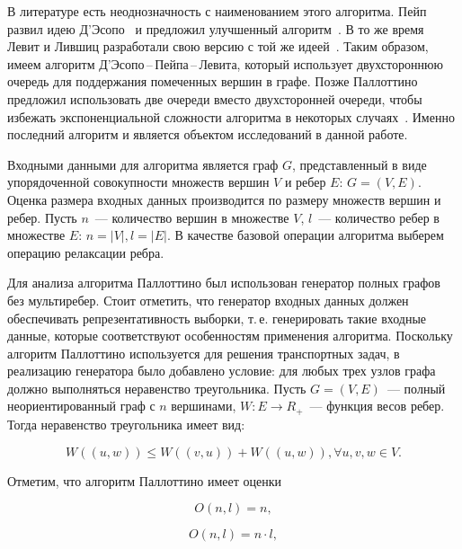 \documentclass[a4paper, article, 14pt]{extarticle}
\begin{document}
В литературе есть неоднозначность с наименованием этого алгоритма. Пейп развил идею Д'Эсопо~\cite{desopo} и предложил улучшенный алгоритм~\cite{pape}. В то же время Левит и Лившиц разработали свою версию с той же идеей~\cite{levit_livshits}. Таким образом, имеем алгоритм Д'Эсопо\,--\,Пейпа\,--\,Левита, который использует двухстороннюю очередь для поддержания помеченных вершин в графе. Позже Паллоттино предложил использовать две очереди вместо двухсторонней очереди, чтобы избежать экспоненциальной сложности алгоритма в некоторых случаях~\cite{pallottino}. Именно последний алгоритм и является объектом исследований в данной работе.

Входными данными для алгоритма является граф $G$, представленный в виде упорядоченной совокупности множеств вершин $V$ и ребер $E$: $G = (V, E)$. Оценка размера входных данных производится по размеру множеств вершин и ребер. Пусть $n$~--- количество вершин в множестве $V$, $l$~--- количество ребер в множестве $E$: $n = |V|, l = |E|$. В качестве базовой операции алгоритма выберем операцию релаксации ребра.

Для анализа алгоритма Паллоттино был использован генератор полных графов без мультиребер. Стоит отметить, что генератор входных данных должен обеспечивать репрезентативность выборки, т.\,е. генерировать такие входные данные, которые соответствуют особенностям применения алгоритма. Поскольку алгоритм Паллоттино используется для решения транспортных задач, в реализацию генератора было добавлено условие: для любых трех узлов графа должно выполняться неравенство треугольника. Пусть $G = (V, E)$~--- полный неориентированный граф с $n$ вершинами, $W: E \rightarrow R_+$~--- функция весов ребер. Тогда неравенство треугольника имеет вид:

\begin{equation}\label{eq:triangle_inequality}
	W((u, w)) \leq W((v, u)) + W((u, w)), \forall u, v, w \in V.
\end{equation}

Отметим, что алгоритм Паллоттино имеет оценки

\begin{equation}\label{eq:pallottino_best}
	O(n, l) = n,
\end{equation}

\begin{equation}\label{eq:pallottino_average}
	O(n, l) = n \cdot l,
\end{equation}
\end{document}
